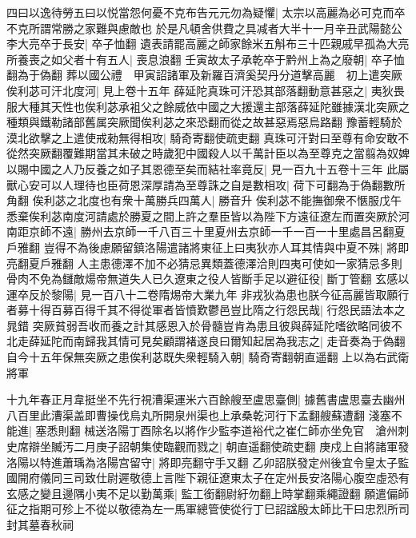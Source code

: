 四曰以逸待勞五曰以悦當怨何憂不克布告元元勿為疑懼|{
	太宗以高麗為必可克而卒不克所謂常勝之家難與慮敵也}
於是凡頓舍供費之具减者大半十一月辛丑武陽懿公李大亮卒于長安|{
	卒子恤翻}
遺表請罷高麗之師家餘米五斛布三十匹親戚早孤為大亮所養喪之如父者十有五人|{
	喪息浪翻}
壬寅故太子承乾卒于黔州上為之廢朝|{
	卒子恤翻為于偽翻}
葬以國公禮　甲寅詔諸軍及新羅百濟奚契丹分道擊高麗　初上遣突厥俟利苾可汗北度河|{
	見上卷十五年}
薛延陀真珠可汗恐其部落翻動意甚惡之|{
	夷狄畏服大種其天性也俟利苾承袓父之餘威依中國之大援還主部落薛延陀雖據漢北突厥之種類與鐵勒諸部舊属突厥聞俟利苾之來恐翻而從之故甚惡焉惡烏路翻}
豫蓄輕騎於漠北欲擊之上遣使戒勑無得相攻|{
	騎奇寄翻使疏吏翻}
真珠可汗對曰至尊有命安敢不從然突厥翻覆難期當其未破之時歲犯中國殺人以千萬計臣以為至尊克之當翦為奴婢以賜中國之人乃反養之如子其恩德至矣而結社率竟反|{
	見一百九十五卷十三年}
此屬獸心安可以人理待也臣荷恩深厚請為至尊誅之自是數相攻|{
	荷下可翻為于偽翻數所角翻}
俟利苾之北度也有衆十萬勝兵四萬人|{
	勝音升}
俟利苾不能撫御衆不愜服戊午悉棄俟利苾南度河請處於勝夏之間上許之羣臣皆以為陛下方遠征遼左而置突厥於河南距京師不遠|{
	勝州去京師一千八百三十里夏州去京師一千一百一十里處昌呂翻夏戶雅翻}
豈得不為後慮願留鎮洛陽遣諸將東征上曰夷狄亦人耳其情與中夏不殊|{
	將即亮翻夏戶雅翻}
人主患德澤不加不必猜忌異類蓋德澤洽則四夷可使如一家猜忌多則骨肉不免為讎敵煬帝無道失人已久遼東之役人皆斷手足以避征役|{
	斷丁管翻}
玄感以運卒反於黎陽|{
	見一百八十二卷隋焬帝大業九年}
非戎狄為患也朕今征高麗皆取願行者募十得百募百得千其不得從軍者皆憤歎鬱邑豈比隋之行怨民哉|{
	行怨民語法本之晁錯}
突厥貧弱吾收而養之計其感恩入於骨髓豈肯為患且彼與薛延陀嗜欲略同彼不北走薛延陀而南歸我其情可見矣顧謂褚遂良曰爾知起居為我志之|{
	走音奏為于偽翻}
自今十五年保無突厥之患俟利苾既失衆輕騎入朝|{
	騎奇寄翻朝直遥翻}
上以為右武衛將軍

十九年春正月韋挺坐不先行視漕渠運米六百餘艘至盧思臺側|{
	據舊書盧思臺去幽州八百里此漕渠盖即曹操伐烏丸所開泉州渠也上承桑乾河行下孟翻艘蘇遭翻}
淺塞不能進|{
	塞悉則翻}
械送洛陽丁酉除名以將作少監李道裕代之崔仁師亦坐免官　滄州刺史席辯坐贓汚二月庚子詔朝集使臨觀而戮之|{
	朝直遥翻使疏吏翻}
庚戍上自將諸軍發洛陽以特進蕭瑀為洛陽宫留守|{
	將即亮翻守手又翻}
乙卯詔朕發定州後宜令皇太子監國開府儀同三司致仕尉遲敬德上言陛下親征遼東太子在定州長安洛陽心腹空虛恐有玄感之變且邊隅小夷不足以勤萬乘|{
	監工銜翻尉紆勿翻上時掌翻乘繩證翻}
願遣偏師征之指期可殄上不從以敬德為左一馬軍總管使從行丁巳詔諡殷太師比干曰忠烈所司封其墓春秋祠

